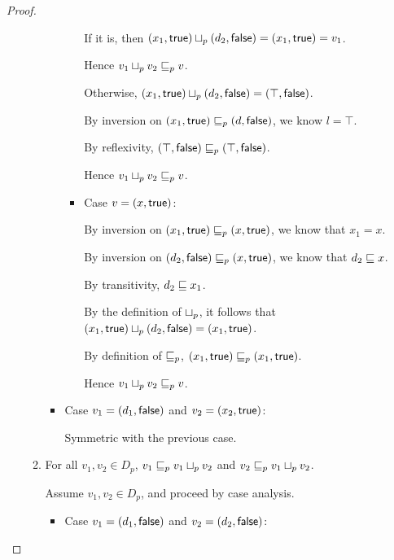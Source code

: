 \begin{proof}
\begin{enumerate}
\begin{enumerate}
\begin{itemize}
\begin{itemize}
          If it is, then $(x_1, \textsf{true})  \sqcup_p 
          (d_2, \textsf{false}) = (x_1, \textsf{true}) = v_1$.

          Hence $v_1 \sqcup_p v_2 \sqsubseteq_p v$.

          Otherwise, $(x_1, \textsf{true})  \sqcup_p 
          (d_2, \textsf{false}) = (\top, \textsf{false})$.

          By inversion on $(x_1, \textsf{true}) \sqsubseteq_p
          (d, \textsf{false})$, we know $l = \top$.

          By reflexivity, $(\top, \textsf{false}) \sqsubseteq_p
          (\top, \textsf{false})$.

          Hence $v_1 \sqcup_p v_2 \sqsubseteq_p v$. 
          
        \item Case $v = (x, \textsf{true})$:  
          
          By inversion on $(x_1, \textsf{true}) \sqsubseteq_p
          (x, \textsf{true})$, we know that $x_1 = x$.

          By inversion on $(d_2, \textsf{false}) \sqsubseteq_p
          (x, \textsf{true})$, we know that $d_2 \sqsubseteq x$.

          By transitivity, $d_2 \sqsubseteq x_1$.

          By the definition of $ \sqcup_p $, it follows that
          $(x_1, \textsf{true})  \sqcup_p 
          (d_2, \textsf{false}) = (x_1, \textsf{true})$.

          By definition of $\sqsubseteq_p$, $(x_1, \textsf{true}) \sqsubseteq_p
          (x_1, \textsf{true})$.

          Hence $v_1 \sqcup_p v_2 \sqsubseteq_p v$. 
        \end{itemize}
        
      \item Case $v_1 = (d_1, \textsf{false})$ and $v_2 =
        (x_2, \textsf{true})$:
        
        Symmetric with the previous case. 
      \end{itemize}
    \item For all $v_1, v_2 \in D_p$, $v_1 \sqsubseteq_p v_1 \sqcup_p v_2$ and
      $v_2 \sqsubseteq_p v_1 \sqcup_p v_2$.
      
      Assume $v_1, v_2 \in D_p$, and proceed by case analysis. 
      \begin{itemize}
      \item Case $v_1 = (d_1, \textsf{false})$ and $v_2 =
        (d_2, \textsf{false})$:


\end{itemize}
\end{enumerate}
\end{enumerate}
\end{proof}
